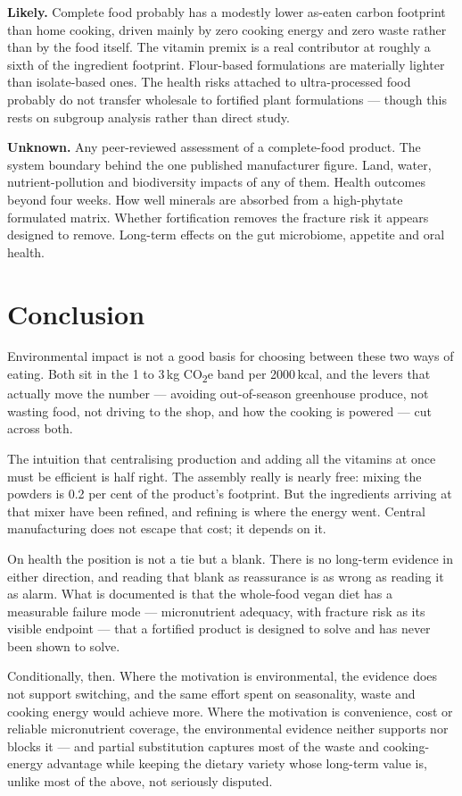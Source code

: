 \documentclass[11pt,a4paper]{article}
\newcommand{\co}{CO\textsubscript{2}e}
\begin{document}
\textbf{Likely.} Complete food probably has a modestly lower as-eaten carbon footprint
than home cooking, driven mainly by zero cooking energy and zero waste rather than by
the food itself. The vitamin premix is a real contributor at roughly a sixth of the
ingredient footprint. Flour-based formulations are materially lighter than
isolate-based ones. The health risks attached to ultra-processed food probably do not
transfer wholesale to fortified plant formulations — though this rests on subgroup
analysis rather than direct study.

\textbf{Unknown.} Any peer-reviewed assessment of a complete-food product. The system
boundary behind the one published manufacturer figure. Land, water, nutrient-pollution
and biodiversity impacts of any of them. Health outcomes beyond four weeks. How well
minerals are absorbed from a high-phytate formulated matrix. Whether fortification
removes the fracture risk it appears designed to remove. Long-term effects on the gut
microbiome, appetite and oral health.

\section{Conclusion}

Environmental impact is not a good basis for choosing between these two ways of eating.
Both sit in the 1 to 3\,kg \co{} band per 2000\,kcal, and the levers that actually move
the number — avoiding out-of-season greenhouse produce, not wasting food, not driving to
the shop, and how the cooking is powered — cut across both.

The intuition that centralising production and adding all the vitamins at once must be
efficient is half right. The assembly really is nearly free: mixing the powders is 0.2
per cent of the product's footprint. But the ingredients arriving at that mixer have
been refined, and refining is where the energy went. Central manufacturing does not
escape that cost; it depends on it.

On health the position is not a tie but a blank. There is no long-term evidence in
either direction, and reading that blank as reassurance is as wrong as reading it as
alarm. What is documented is that the whole-food vegan diet has a measurable failure
mode — micronutrient adequacy, with fracture risk as its visible endpoint — that a
fortified product is designed to solve and has never been shown to solve.

Conditionally, then. Where the motivation is environmental, the evidence does not
support switching, and the same effort spent on seasonality, waste and cooking energy
would achieve more. Where the motivation is convenience, cost or reliable micronutrient
coverage, the environmental evidence neither supports nor blocks it — and partial
substitution captures most of the waste and cooking-energy advantage while keeping the
dietary variety whose long-term value is, unlike most of the above, not seriously
disputed.
\end{document}
